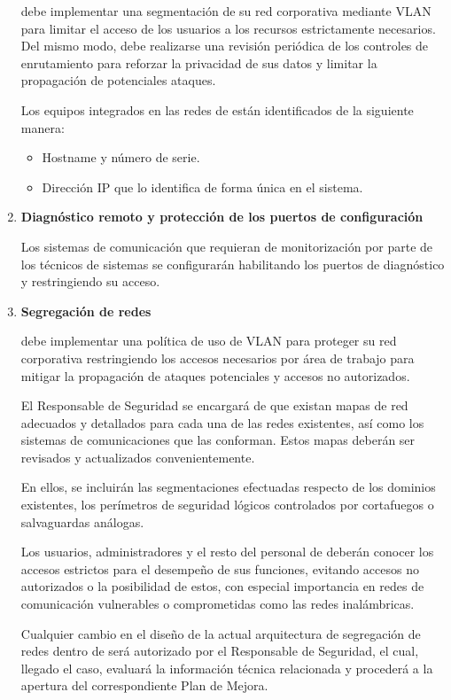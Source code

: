 \begin{enumerate}[label=\alph*)]
\Beneficiario{} debe implementar una segmentación de su red corporativa mediante VLAN para limitar el acceso de los usuarios a los recursos estrictamente necesarios. Del mismo modo, debe realizarse una revisión periódica de los controles de enrutamiento para reforzar la privacidad de sus datos y limitar la propagación de potenciales ataques.

Los equipos integrados en las redes de \Beneficiario{} están identificados de la siguiente manera:

\begin{itemize}
    \item Hostname y número de serie.
    \item Dirección IP que lo identifica de forma única en el sistema.
\end{itemize}

\item \textbf{Diagnóstico remoto y protección de los puertos de configuración}

Los sistemas de comunicación que requieran de monitorización por parte de los técnicos de sistemas se configurarán habilitando los puertos de diagnóstico y restringiendo su acceso.

\item \textbf{Segregación de redes}

\Beneficiario{} debe implementar una política de uso de VLAN para proteger su red corporativa restringiendo los accesos necesarios por área de trabajo para mitigar la propagación de ataques potenciales y accesos no autorizados.

El Responsable de Seguridad se encargará de que existan mapas de red adecuados y detallados para cada una de las redes existentes, así como los sistemas de comunicaciones que las conforman. Estos mapas deberán ser revisados y actualizados convenientemente.

En ellos, se incluirán las segmentaciones efectuadas respecto de los dominios existentes, los perímetros de seguridad lógicos controlados por cortafuegos o salvaguardas análogas.

Los usuarios, administradores y el resto del personal de \Beneficiario{} deberán conocer los accesos estrictos para el desempeño de sus funciones, evitando accesos no autorizados o la posibilidad de estos, con especial importancia en redes de comunicación vulnerables o comprometidas como las redes inalámbricas.

Cualquier cambio en el diseño de la actual arquitectura de segregación de redes dentro de \Beneficiario{} será autorizado por el Responsable de Seguridad, el cual, llegado el caso, evaluará la información técnica relacionada y procederá a la apertura del correspondiente Plan de Mejora.


\end{enumerate}
